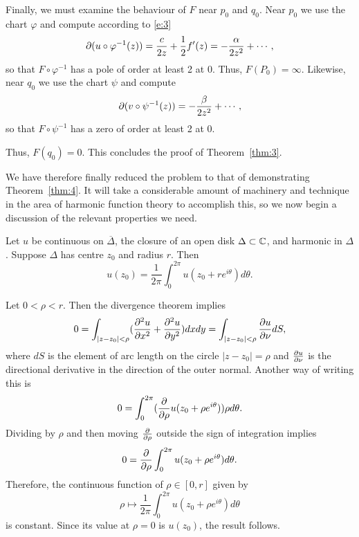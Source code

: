 \documentclass[a4paper,11pt]{article}
\begin{document}
Finally, we must examine the behaviour of $F$ near $p_0$ and $q_0$.
Near $p_0$ we use the chart $\varphi$ and compute according to
\eqref{e:3}
$$
\partial(u \circ \varphi^{-1}(z)) = \frac{c}{2z} + \frac{1}{2}f'(z)
= -\frac{\alpha}{2z^2} + \cdots,
$$
so that $F\circ \varphi^{-1}$ has a pole of order at least 2 at 0.
Thus, $F(P_0) = \infty$.  Likewise, near $q_0$ we use the chart $\psi$
and compute
$$
\partial(v \circ \psi^{-1}(z)) = -\frac{\beta}{2z^2} + \cdots,
$$
so that $F \circ \psi^{-1}$ has a zero of order at least 2 at 0.

Thus, $F(q_0) = 0$.  This concludes the proof of Theorem~\ref{thm:3}.

We have therefore finally reduced the problem to that of demonstrating
Theorem~\ref{thm:4}.  It will take a considerable amount of machinery
and technique in the area of harmonic function theory to accomplish
this, so we now begin a discussion of the relevant properties we
need.

\begin{propn}
  \label{propn:4}
  Let $u$ be continuous on $\overline{\Delta}$, the closure of an open
  disk $\Delta \subset {\mathbb C}$, and harmonic in $\Delta$.  Suppose
  $\Delta$ has centre $z_0$ and radius $r$.  Then
  $$
  u(z_0) = \frac{1}{2\pi} \int_0^{2\pi} u(z_0 + re^{i\theta})
  d\theta.
  $$
\end{propn}

\begin{myproof}
  Let $0 < \rho < r$.  Then the divergence theorem implies
  $$
  0 = \int_{|z-z_0|< \rho} (\frac{\partial^2u}{\partial x^2} + \frac{\partial^2u}{\partial
    y^2}) dx dy = \int_{|z-z_0|<\rho} \frac{\partial u}{\partial \nu} dS,
  $$
  where $dS$ is the element of arc length on the circle $|z-z_0| =
  \rho$ and $\frac{\partial u}{\partial \nu}$ is the directional derivative in the
  direction of the outer normal.  Another way of writing this is
  $$
  0 = \int_0^{2\pi} (\frac{\partial}{\partial \rho} u(z_0 + \rho e^{i\theta}))
  \rho d\theta.
  $$
  Dividing by $\rho$ and then moving $\frac{\partial}{\partial \rho}$ outside the
  sign of integration implies
  $$
  0 = \frac{\partial}{\partial \rho}\int_0^{2\pi} u(z_0 + \rho e^{i\theta}) d\theta.
  $$
  Therefore, the continuous function of $\rho \in [0,r]$ given by
  $$
  \rho \mapsto \frac{1}{2\pi} \int_0^{2\pi} u(z_0 + \rho e^{i\theta})
  d\theta
  $$
  is constant.  Since its value at $\rho = 0$ is $u(z_0)$, the result
  follows. 
\end{myproof}
\end{document}
